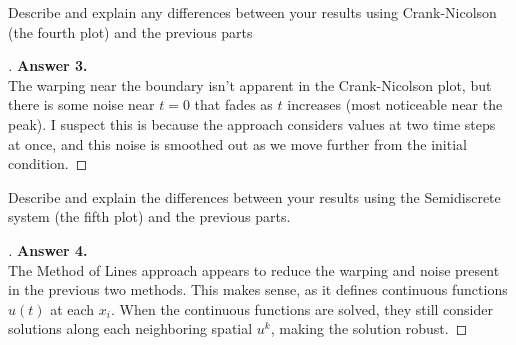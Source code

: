 \documentclass[12pt]{article}
\newenvironment{exercise}[2][Exercise]{\begin{trivlist}
\item[\hskip \labelsep {\bfseries #1}\hskip \labelsep {\bfseries #2.}]}{\end{trivlist}}
\begin{document}
\vspace{5mm}
\begin{exercise}{3}
	Describe and explain any differences between your results using Crank-Nicolson (the fourth plot) and the previous parts
\end{exercise}%
\begin{proof}[]
\textbf{Answer 3.} \\%
	The warping near the boundary isn't apparent in the Crank-Nicolson plot, but there is some noise near $t = 0$ that fades as $t$ increases (most noticeable near the peak). I suspect this is because the approach considers values at two time steps at once, and this noise is smoothed out as we move further from the initial condition.
\end{proof}

\pagebreak
\vspace{5mm}
\begin{exercise}{4}
	Describe and explain the differences between your results using the Semidiscrete system (the fifth plot) and the previous parts.
\end{exercise}%
\begin{proof}[]
\textbf{Answer 4.} \\%
	The Method of Lines approach appears to reduce the warping and noise present in the previous two methods. This makes sense, as it defines continuous functions $u(t)$ at each $x_i$. When the continuous functions are solved, they still consider solutions along each neighboring spatial $u^k$, making the solution robust.
\end{proof}
\end{document}
